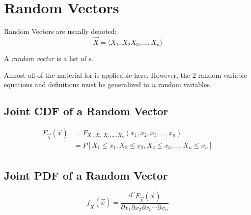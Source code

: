 \section{Random Vectors} \label{sec:Random Vectors}
Random Vectors are usually denoted:
	\begin{equation} \label{eq:Random Vector Notation}
		\vec{X} = \langle X_{1}, X_{2} X_{3}, \ldots, X_{n} \rangle
	\end{equation}
	\begin{definition} \label{def:Random Vector}
		A \emph{random vector} is a list of s.
		\begin{remark}
			Almost all of the material for  is applicable here.
			However, the 2 random variable equations and definitions must be generalized to $n$ random variables.
		\end{remark}
	\end{definition}
	
	\subsection{Joint CDF of a Random Vector} \label{subsec:Joint CDF of Random Vector}
		\begin{equation} \label{eq:Joint CDF of Random Vector}
			\begin{aligned}
				F_{\vec{X}} \left( \vec{x} \right) 
					&= F_{X_{1}, X_{2}, X_{3}, \ldots, X_{n}} \left( x_{1}, x_{2}, x_{3}, \ldots, x_{n} \right) \\
					&= P \left[ X_{1} \leq x_{1}, X_{2} \leq x_{2}, X_{3} \leq x_{3}, \ldots, X_{n} \leq x_{n} \right] \\
			\end{aligned}
		\end{equation}
		
	\subsection{Joint PDF of a Random Vector} \label{subsec:Joint PDF of Random Vector}
		\begin{equation} \label{eq:Joint PDF of Random Vector}
			f_{\vec{X}} \left( \vec{x} \right) = \frac{\partial^{n} F_{\vec{X}} \left( \vec{x} \right)}{\partial x_{1} \partial x_{2} \partial x_{3} \cdots \partial x_{n}}
		\end{equation}
		
